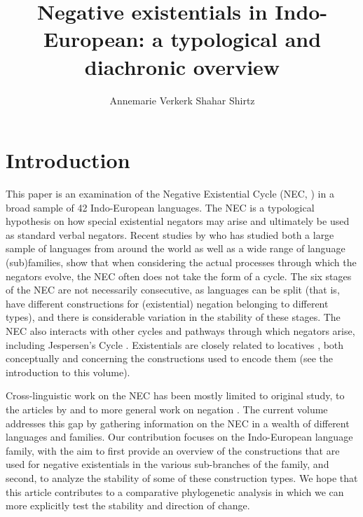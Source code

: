 \documentclass[output=paper]{langsci/langscibook}
\title{Negative existentials in Indo-European: a typological and diachronic overview}
\author{Annemarie Verkerk\affiliation{Max Planck Institute for the Science
of Human History\\ Universität des Saarlandes}\lastand
Shahar Shirtz\affiliation{University of Oregon}%
}
\begin{document}
\section{Introduction}\label{sec:ieur-1}

This paper is an examination of the Negative Existential Cycle (NEC,
\citealt{Croft1991}) in a broad sample of 42
Indo-European languages. The
NEC is a typological hypothesis on how special existential negators may
arise and ultimately be used as standard verbal negators. Recent studies by
\textcites{Veselinova2013}{Veselinova2014}{Veselinova2015}{Veselinova2016} who has studied both a large sample of
languages from around the world as well as a wide range of language
(sub)families, show that when considering the actual processes through
which the negators evolve, the NEC often does not take the form of a cycle.
The six stages of the NEC are not necessarily consecutive, as languages can
be split (that is, have different constructions for (existential) negation
belonging to different types), and there is considerable variation in the
stability of these stages. The NEC also interacts with other cycles and
pathways through which negators arise, including Jespersen's Cycle
\parencite[see][]{Gelderen2019}. Existentials are closely related to
locatives \parencites{Clark1978}{Creissels2013ieur}, both conceptually and
concerning the constructions used to encode them (see the introduction to
this volume). 

Cross-linguistic work on the NEC has been mostly limited to
 original study, to the articles by
\textcites{Veselinova2013}{Veselinova2014}{Veselinova2015}{Veselinova2016}
    and to more general work on negation 
\parencites{KahrelBerg1994}{CyfferEbermann2009}{Budd2010}{WillisLucas2013-ieur}.
The current volume addresses this gap by gathering information on the NEC
in a wealth of different languages and
families. Our contribution focuses on the Indo-European language family,
with the aim to first provide an overview of the constructions that are
used for negative existentials in the various sub-branches of the family,
and second, to analyze the stability of some of these construction types.
We hope that this article contributes to a comparative phylogenetic
analysis in which we can more explicitly test the stability and direction
of change. 
\end{document}

